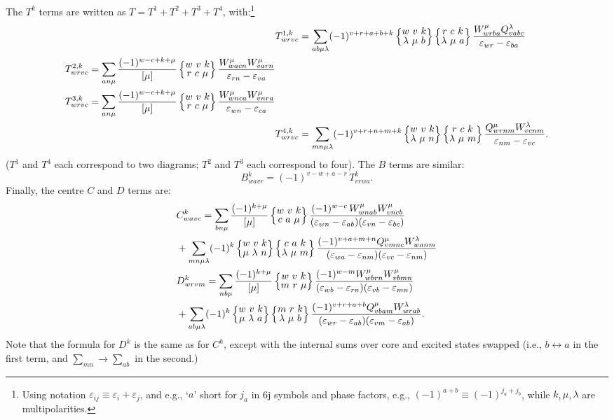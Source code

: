 \documentclass[10pt,twocolumn,a4paper]{article}%
\newcommand{\sixjs}[6]{\renewcommand\arraystretch{0.75}\ensuremath{\begin{Bmatrix}#1~#2~#3\\#4~#5~#6\end{Bmatrix}}}	%
\newcommand{\be}{\begin{equation}}
\newcommand{\ee}{\end{equation}}
\def\en{\ensuremath{\varepsilon}}
\begin{document}
The $T^k$ terms are written as
$T=T^1+T^2+T^3+T^4$, with:\footnote{Using notation
$\en_{ij}\equiv\en_i+\en_j$, and e.g., `$a$' short for $j_a$ in 6j symbols and phase factors, e.g.,
$(-1)^{a+b}\equiv(-1)^{j_a + j_b}$, while $k$,\,$\mu$,\,$\lambda$ are multipolarities.}
\begin{align}
&\notag
T^{1,k}_{wrvc} =
\sum_{ab\mu\lambda}(-1)^{v+r+a+b+k}
\sixjs{w}{v}{k}{\lambda}{\mu}{b}
\sixjs{r}{c}{k}{\lambda}{\mu}{a}
\frac{W^\mu_{wrba}Q^\lambda_{vabc}}{\en_{wr}-\en_{ba}}
\\
\begin{split}
&T^{2,k}_{wrvc} =
\sum_{an\mu}\frac{(-1)^{w-c+k+\mu}}{[\mu]}
\sixjs{w}{v}{k}{r}{c}{\mu}
\frac{W^\mu_{wacn}W^\mu_{varn}}{\en_{rn}-\en_{va}}
\\
&T^{3,k}_{wrvc} =
\sum_{an\mu}\frac{(-1)^{w-c+k+\mu}}{[\mu]}
\sixjs{w}{v}{k}{r}{c}{\mu}
\frac{W^\mu_{wnca}W^\mu_{vnra}}{\en_{wn}-\en_{ca}}
\end{split}
\\
&\notag
T^{4,k}_{wrvc} =
\sum_{mn\mu\lambda}(-1)^{v+r+n+m+k}
\sixjs{w}{v}{k}{\lambda}{\mu}{n}
\sixjs{r}{c}{k}{\lambda}{\mu}{m}
\frac{Q^\mu_{wrnm}W^\lambda_{vcnm}}{\en_{nm}-\en_{vc}}.
\end{align}
($T^1$ and $T^4$ each correspond to two diagrams; $T^2$ and $T^3$ each correspond to four).
The $B$ terms are similar:
\be
B^{k}_{wavr} = (-1)^{v-w+a-r}\,T^{k}_{vrwa}.
\ee
%
Finally, the centre $C$ and $D$ terms are:
\begin{align}
&\notag
C^{k}_{wavc} =
\sum_{bn\mu}\frac{(-1)^{k+\mu}}{[\mu]}
\sixjs{w}{v}{k}{c}{a}{\mu}
\frac{(-1)^{w-c}\,W^\mu_{wnab}W^\mu_{vncb}}{(\en_{wn}-\en_{ab})(\en_{vn}-\en_{bc})}
\\
&+\sum_{mn\mu\lambda}(-1)^{k}
\sixjs{w}{v}{k}{\mu}{\lambda}{n}
\sixjs{c}{a}{k}{\lambda}{\mu}{m}
\frac{(-1)^{v+a+m+n}Q^\mu_{vmnc}W^\lambda_{wanm}}{(\en_{wa}-\en_{nm})(\en_{vc}-\en_{nm})}
\\
&\notag
D^{k}_{wrvm} =
\sum_{nb\mu}\frac{(-1)^{k+\mu}}{[\mu]}
\sixjs{w}{v}{k}{m}{r}{\mu}
\frac{(-1)^{w-m}W^\mu_{wbrn}W^\mu_{vbmn}}{(\en_{wb}-\en_{rn})(\en_{vb}-\en_{mn})}
\\
&\notag+
\sum_{ab\mu\lambda}(-1)^{k}
\sixjs{w}{v}{k}{\mu}{\lambda}{a}
\sixjs{m}{r}{k}{\lambda}{\mu}{b}
\frac{(-1)^{v+r+a+b}Q^\mu_{vbam}W^\lambda_{wrab}}{(\en_{wr}-\en_{ab})(\en_{vm}-\en_{ab})}.
\end{align}
Note that the formula for $D^k$ is the same as for $C^k$, except with the internal sums over core and excited states swapped
(i.e., $b\leftrightarrow a$ in the first term, and $\sum_{mn}\to\sum_{ab}$ in the second.)
\end{document}
